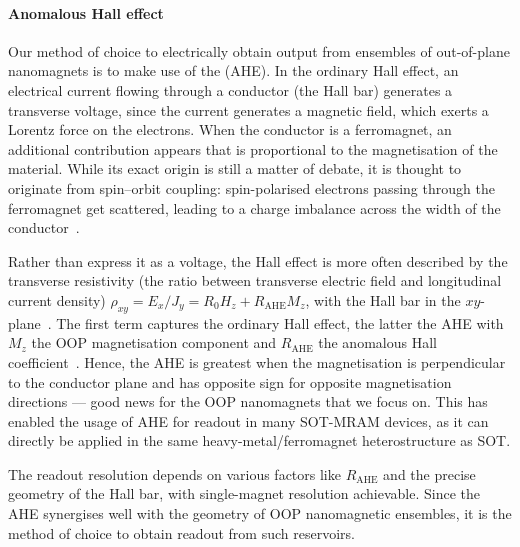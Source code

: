 \paragraph{Anomalous Hall effect}
Our method of choice to electrically obtain output from ensembles of out-of-plane nanomagnets is to make use of the  (AHE).
In the ordinary Hall effect, an electrical current flowing through a conductor (the Hall bar) generates a transverse voltage, since the current generates a magnetic field, which exerts a Lorentz force on the electrons.
When the conductor is a ferromagnet, an additional contribution appears that is proportional to the magnetisation of the material.
While its exact origin is still a matter of debate, it is thought to originate from spin--orbit coupling: spin-polarised electrons passing through the ferromagnet get scattered, leading to a charge imbalance across the width of the conductor~\cite{AHE_Culcer,AHE}. \par
Rather than express it as a voltage, the Hall effect is more often described by the transverse resistivity (the ratio between transverse electric field and longitudinal current density) $\rho_{xy} = E_x/J_y = R_0 H_z + R_\mathrm{AHE} M_z$, with the Hall bar in the $xy$-plane~\cite{SHE,AHE}.
The first term captures the ordinary Hall effect, the latter the AHE with $M_z$ the OOP magnetisation component and $R_\mathrm{AHE}$ the anomalous Hall coefficient~\cite{AHE}.
Hence, the AHE is greatest when the magnetisation is perpendicular to the conductor plane and has opposite sign for opposite magnetisation directions --- good news for the OOP nanomagnets that we focus on.
This has enabled the usage of AHE for readout in many SOT-MRAM devices, as it can directly be applied in the same heavy-metal/ferromagnet heterostructure as SOT. \par
The readout resolution depends on various factors like $R_\mathrm{AHE}$ and the precise geometry of the Hall bar, with single-magnet resolution achievable. %
Since the AHE synergises well with the geometry of OOP nanomagnetic ensembles, it is the method of choice to obtain readout from such reservoirs.

